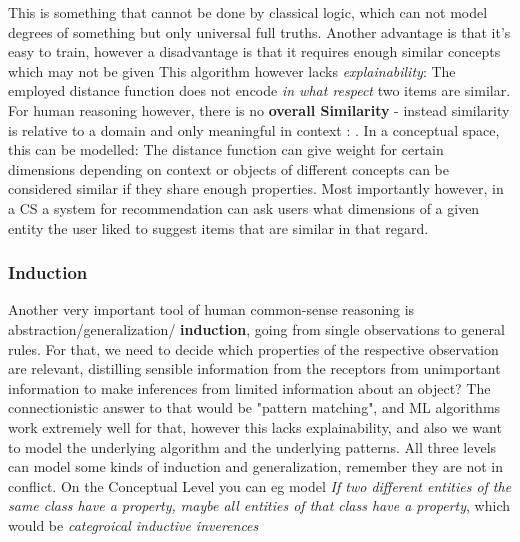 \vspace{2ex}

This is something that cannot be done by classical logic, which can not model degrees of something but only universal full truths. Another advantage is that it's easy to train, however a disadvantage is that it requires enough similar concepts which may not be given This algorithm however lacks \textit{explainability}: The employed distance function does not encode \textit{in what respect} two items are similar. For human reasoning however, there is no \textbf{overall Similarity} - instead similarity is relative to a domain and only meaningful in context \cite{Goodman1972-GOOPAP-3}:  \cite[110]{Gardenfors2000a}. In a conceptual space, this can be modelled: The distance function can give weight for certain dimensions depending on context or objects of different concepts can be considered similar if they share enough properties. Most importantly however, in a CS a system for recommendation can ask users what dimensions of a given entity the user liked to suggest items that are similar in that regard.

\subsubsection*{Induction}

Another very important tool of human common-sense reasoning is abstraction/generalization/ \textbf{induction}, going from single observations to general rules. For that, we need to decide which properties of the respective observation are relevant, distilling sensible information from the receptors from unimportant information to make inferences from limited information about an object? The connectionistic answer to that would be "pattern matching", and ML algorithms work extremely well for that, however this lacks explainability, and also we want to model the underlying algorithm and the underlying patterns. All three levels can model some kinds of induction and generalization, remember they are not in conflict. On the Conceptual Level you can eg model \textit{If two different entities of the same class have a property, maybe all entities of that class have a property}, which would be \textit{categroical inductive inverences}

